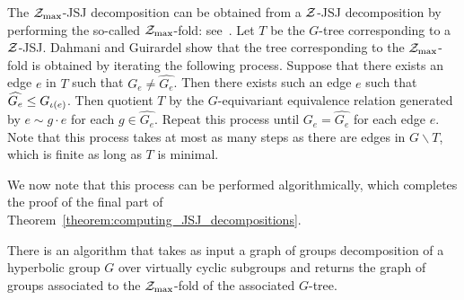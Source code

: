The $\mathcal{Z}_\text{max}$-JSJ decomposition can be obtained from a $\mathcal{Z}$-JSJ decomposition by performing the so-called $\mathcal{Z}_\text{max}$-fold: see~\cite[Proposition 4.11]{dahmaniguirardel11}.
Let $T$ be the $G$-tree corresponding to a $\mathcal{Z}$-JSJ.
Dahmani and Guirardel show that the tree corresponding to the $\mathcal{Z}_\text{max}$-fold is obtained by iterating the following process.
Suppose that there exists an edge $e$ in $T$ such that $G_e \neq \widehat{G_e}$.
Then there exists such an edge $e$ such that $\widehat{G_e} \leq G_{\operatorname{\iota}(e)}$.
Then quotient $T$ by the $G$-equivariant equivalence relation generated by $e \sim g\cdot e$ for each $g \in \widehat{G_e}$.
Repeat this process until $G_e = \widehat{G_e}$ for each edge $e$.
Note that this process takes at most as many steps as there are edges in $G \backslash T$, which is finite as long as $T$ is minimal.

We now note that this process can be performed algorithmically, which completes the proof of the final part of Theorem~\ref{theorem:computing_JSJ_decompositions}.

\begin{lemma} 
  There is an algorithm that takes as input a graph of groups decomposition of a hyperbolic group $G$ over virtually cyclic subgroups and returns the graph of groups associated to the $\mathcal{Z}_\text{max}$-fold of the associated $G$-tree.
\end{lemma}

